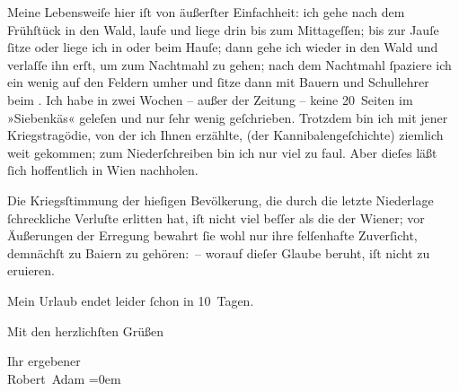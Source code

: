 \pstart
           Meine Lebensweiſe hier iſt von äußerſter Einfachheit: ich gehe nach dem Frühſtück in
               den Wald, laufe und liege drin bis zum Mittageſſen; bis zur Jauſe ſitze oder liege
               ich in oder beim Hauſe; dann gehe ich wieder in den Wald und verlaſſe ihn erſt, um
               zum Nachtmahl zu gehen; nach dem Nachtmahl ſpaziere ich ein wenig auf den Feldern
               umher und ſitze dann mit Bauern und Schul{\pb}lehrer beim \label{K_L02289-1v}\label{K_L02289-1}. Ich habe in
               zwei Wochen – außer der Zeitung – keine 20 Seiten im »Siebenkäs« geleſen und nur ſehr wenig geſchrieben. Trotzdem bin ich mit
               jener Kriegstragödie, von
                  der ich Ihnen erzählte, (der
               Kannibalengeſchichte) ziemlich weit gekommen; zum Niederſchreiben bin ich nur viel zu
               faul. Aber dieſes läßt ſich hoffentlich in Wien
               nachholen.\pend
           
\pstart
           Die Kriegsſtimmung der hieſigen Bevölkerung, die durch die letzte Niederlage
               ſchreckliche Verluſte erlitten hat, iſt nicht viel beſſer als die der Wiener; vor Äußerungen der Erregung bewahrt ſie
               wohl nur ihre felſenhafte Zuverſicht, demnächſt zu Baiern zu gehören: – worauf dieſer Glaube beruht, iſt nicht zu eruieren.\pend
           
\pstart
           Mein Urlaub endet leider ſchon in 10 Tagen.\pend
           
\pstart
           Mit den herzlichſten Grüßen\pend
           
\pstart
           Ihr ergebener{\\[\baselineskip]}\spacefill\mbox{Robert Adam}\pend
           \leftskip=0em{}\endnumbering{}  
      